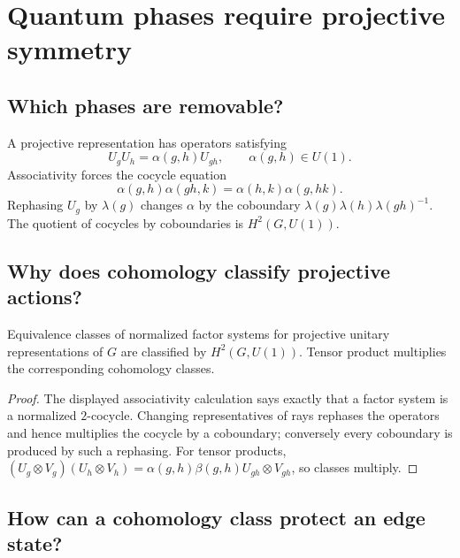 \chapter{Quantum phases require projective symmetry}
\label{ch:projective}



\section{Which phases are removable?}

A projective representation has operators satisfying
\[
U_gU_h=\alpha(g,h)U_{gh},\qquad \alpha(g,h)\in U(1).
\]
Associativity forces the cocycle equation
\[
\alpha(g,h)\alpha(gh,k)=\alpha(h,k)\alpha(g,hk).
\]
Rephasing $U_g$ by $\lambda(g)$ changes $\alpha$ by the coboundary
$\lambda(g)\lambda(h)\lambda(gh)^{-1}$.  The quotient of cocycles by
coboundaries is $H^2(G,U(1))$.

\section{Why does cohomology classify projective actions?}

\begin{theorem}
Equivalence classes of normalized factor systems for projective unitary
representations of $G$ are classified by $H^2(G,U(1))$.  Tensor product
multiplies the corresponding cohomology classes.
\end{theorem}

\begin{proof}
The displayed associativity calculation says exactly that a factor system is
a normalized $2$-cocycle.  Changing representatives of rays rephases the
operators and hence multiplies the cocycle by a coboundary; conversely every
coboundary is produced by such a rephasing.  For tensor products,
$(U_g\otimes V_g)(U_h\otimes V_h)=
\alpha(g,h)\beta(g,h)U_{gh}\otimes V_{gh}$, so classes multiply.
\end{proof}

\section{How can a cohomology class protect an edge state?}

